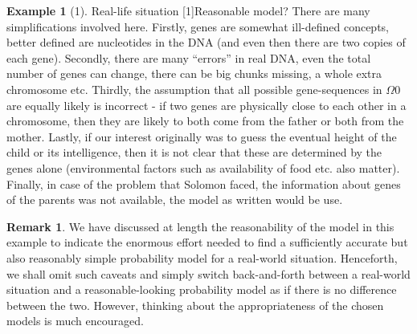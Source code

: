 \documentclass[preprint,  11pt]{amsart}
\theoremstyle{plain} %
\theoremstyle{definition} %
\newtheorem{remark}[theorem]{Remark}
\newtheorem{example}[theorem]{Example}
\begin{document}
\begin{example}[1]{\vspace{4mm}Real-life situation}
[1]{\vspace{4mm}Reasonable model?} There are many simplifications involved here. Firstly, genes are somewhat ill-defined concepts, better defined are nucleotides in the DNA (and even then there are two copies of each gene). Secondly, there are many ``errors'' in real DNA, even the total number of genes can change, there can be big chunks missing, a whole extra chromosome etc. Thirdly, the assumption that all possible gene-sequences in $\Omega{0}$ are equally likely is incorrect - if two genes are physically close to each other in a chromosome, then they are likely to both come from the father or both from the mother. Lastly, if our interest originally was to guess the eventual height of the child or its intelligence, then it is not clear that these are determined by the genes alone (environmental factors such as availability of food etc. also matter). Finally, in case of the problem that Solomon faced, the information about genes of the parents was not available, the model as written would be use. 
\end{example}
\begin{remark}We have discussed at length the reasonability of the model in this example to indicate the enormous effort needed to find a sufficiently  accurate but also reasonably simple probability model for a real-world situation. Henceforth, we shall omit such caveats and simply switch back-and-forth between a real-world situation and a reasonable-looking probability model as if there is no difference between the two. However, thinking about the appropriateness of the chosen models is much encouraged. 
\end{remark}
\end{document}
